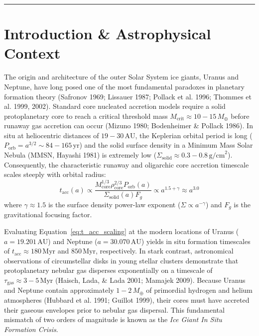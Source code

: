\documentclass[11pt,a4paper]{article}
\begin{document}
\vspace{0.3em}
\begin{center}
\rule{\textwidth}{0.8pt}
\end{center}

\section{Introduction \& Astrophysical Context}
The origin and architecture of the outer Solar System ice giants, Uranus and Neptune, have long posed one of the most fundamental paradoxes in planetary formation theory (Safronov 1969; Lissauer 1987; Pollack et al. 1996; Thommes et al. 1999, 2002). Standard core nucleated accretion models require a solid protoplanetary core to reach a critical threshold mass $M_{\text{crit}} \approx 10-15\,M_\oplus$ before runaway gas accretion can occur (Mizuno 1980; Bodenheimer \& Pollack 1986). In situ at heliocentric distances of $19-30\,\text{AU}$, the Keplerian orbital period is long ($P_{\text{orb}} = a^{3/2} \sim 84-165\,\text{yr}$) and the solid surface density in a Minimum Mass Solar Nebula (MMSN, Hayashi 1981) is extremely low ($\Sigma_{\text{solid}} \approx 0.3-0.8\,\text{g/cm}^2$). Consequently, the characteristic runaway and oligarchic core accretion timescale scales steeply with orbital radius:
\begin{equation}
t_{\text{acc}}(a) \propto \frac{M_{\text{core}}^{1/3} \rho_{\text{core}}^{2/3} P_{\text{orb}}(a)}{\Sigma_{\text{solid}}(a) F_g} \propto a^{1.5 + \gamma} \approx a^{3.0}
\label{eq:t_acc_scaling}
\end{equation}
where $\gamma \approx 1.5$ is the surface density power-law exponent ($\Sigma \propto a^{-\gamma}$) and $F_g$ is the gravitational focusing factor.

Evaluating Equation~\eqref{eq:t_acc_scaling} at the modern locations of Uranus ($a = 19.201\,\text{AU}$) and Neptune ($a = 30.070\,\text{AU}$) yields in situ formation timescales of $t_{\text{acc}} \approx 180\,\text{Myr}$ and $850\,\text{Myr}$, respectively. In stark contrast, astronomical observations of circumstellar disks in young stellar clusters demonstrate that protoplanetary nebular gas disperses exponentially on a timescale of $\tau_{\text{gas}} \approx 3-5\,\text{Myr}$ (Haisch, Lada, \& Lada 2001; Mamajek 2009). Because Uranus and Neptune contain approximately $1-2\,M_\oplus$ of primordial hydrogen and helium atmospheres (Hubbard et al. 1991; Guillot 1999), their cores must have accreted their gaseous envelopes prior to nebular gas dispersal. This fundamental mismatch of two orders of magnitude is known as the \textit{Ice Giant In Situ Formation Crisis}.
\end{document}
